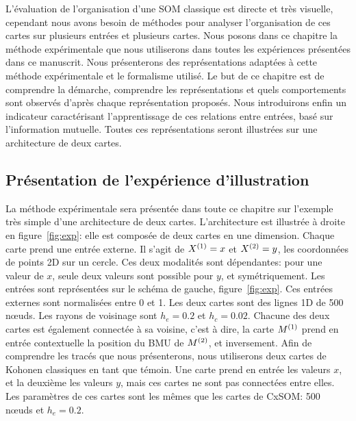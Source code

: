 L'évaluation de l'organisation d'une SOM classique est directe et très visuelle, cependant nous avons besoin de méthodes pour analyser l'organisation de ces cartes sur plusieurs entrées et plusieurs cartes. Nous posons dans ce chapitre la méthode expérimentale que nous utiliserons dans toutes les expériences présentées dans ce manuscrit. 
Nous présenterons des représentations adaptées à cette méthode expérimentale et le formalisme utilisé. Le but de ce chapitre est de comprendre la démarche, comprendre les représentations et quels comportements sont observés d'après chaque représentation proposés. 
Nous introduirons enfin un indicateur caractérisant l'apprentissage de ces relations entre entrées, basé sur l'information mutuelle.
Toutes ces représentations seront illustrées sur une architecture de deux cartes.

\subsection{Présentation de l'expérience d'illustration}

La méthode expérimentale sera présentée dans toute ce chapitre sur l'exemple très simple d'une architecture de deux cartes. L'architecture est illustrée à droite en figure~\ref{fig:exp}: elle est composée de deux cartes en une dimension. Chaque carte prend une entrée externe. Il s'agit de $X^{({1})}=x$ et $X^{({2})}=y$, les coordonnées de points 2D sur un cercle. Ces deux modalités sont dépendantes: pour une valeur de $x$, seule deux valeurs sont possible pour $y$, et symétriquement. Les entrées sont représentées sur le schéma de gauche, figure~\ref{fig:exp}.
Ces entrées externes sont normalisées entre 0 et 1. Les deux cartes sont des lignes 1D de 500 n\oe{}uds. Les rayons de voisinage sont $h_e = 0.2$ et $h_c = 0.02$.
Chacune des deux cartes est également connectée à sa voisine, c'est à dire, la carte $M^{({1})}$ prend en entrée contextuelle la position du BMU de $M^{({2})}$, et inversement.
Afin de comprendre les tracés que nous présenterons, nous utiliserons deux cartes de Kohonen classiques en tant que témoin.
Une carte prend en entrée les valeurs $x$, et la deuxième les valeurs $y$, mais ces cartes ne sont pas connectées entre elles. Les paramètres de ces cartes sont les mêmes que les cartes de CxSOM: 500 n\oe{}uds et $h_e = 0.2$.


